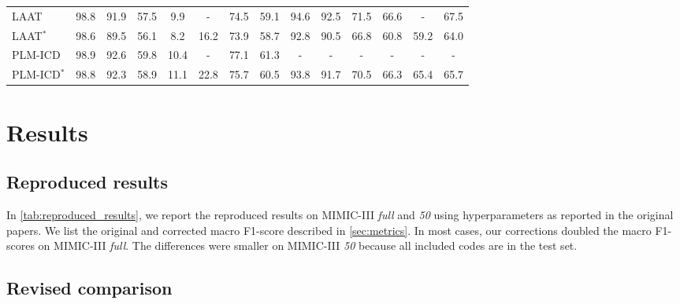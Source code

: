 {\begin{sidewaystable}
{\begin{tabular}{l  cc  ccc  cc  cc  ccc  c}
        \hline
        LAAT  &  98.8 &  91.9 &  57.5 & 9.9 & - &  74.5 &  59.1  &  94.6 &  92.5 &  71.5 &  66.6 & - &  67.5 \\
        LAAT$^*$ & 98.6 & 89.5 & 56.1 & 8.2 & 16.2 & 73.9 & 58.7 & 92.8 & 90.5 & 66.8 & 60.8 & 59.2 & 64.0  \\
        \hline
        PLM-ICD  &  98.9 & 92.6 &  59.8 & 10.4 & - &  77.1 &  61.3  & - & - & - & - & - & -  \\
        PLM-ICD$^*$ & 98.8 & 92.3 & 58.9 & 11.1 & 22.8 & 75.7 & 60.5 & 93.8 & 91.7 & 70.5 & 66.3 & 65.4 & 65.7 \\
        \bottomrule
    \end{tabular}%
    }
\end{sidewaystable}

\section{Results}
\subsection{Reproduced results}


In \cref{tab:reproduced_results}, we report the reproduced results on MIMIC-III \textit{full} and \textit{50} using hyperparameters as reported in the original papers. We list the original and corrected macro F1-score described in \cref{sec:metrics}. In most cases, our corrections doubled the macro F1-scores on MIMIC-III \textit{full}. The differences were smaller on MIMIC-III \textit{50} because all included codes are in the test set.


\subsection{Revised comparison}

}
